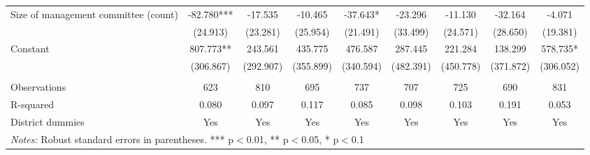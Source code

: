 \documentclass[11pt]{article}
\begin{document}
\begin{landscape}
\begin{table}[H]
{\begin{tabularx}{1.8\linewidth}{lcccccccc}
Size of management committee (count) & -82.780*** & -17.535 & -10.465 & -37.643* & -23.296 & -11.130 & -32.164 & -4.071 \\
 & (24.913) & (23.281) & (25.954) & (21.491) & (33.499) & (24.571) & (28.650) & (19.381) \\
Constant & 807.773** & 243.561 & 435.775 & 476.587 & 287.445 & 221.284 & 138.299 & 578.735* \\
 & (306.867) & (292.907) & (355.899) & (340.594) & (482.391) & (450.778) & (371.872) & (306.052) \\
 &  &  &  &  &  &  &  &  \\
Observations & 623 & 810 & 695 & 737 & 707 & 725 & 690 & 831 \\
R-squared & 0.080 & 0.097 & 0.117 & 0.085 & 0.098 & 0.103 & 0.191 & 0.053 \\
 District dummies & Yes & Yes & Yes & Yes & Yes & Yes & Yes & Yes \\ \hline
\multicolumn{9}{l}{\textit{Notes:} Robust standard errors in parentheses. *** p$<$0.01, ** p$<$0.05, * p$<$0.1} \\
  \end{tabularx}}
\end{table}
\doublespacing

\end{landscape}

\newpage

\end{document}
